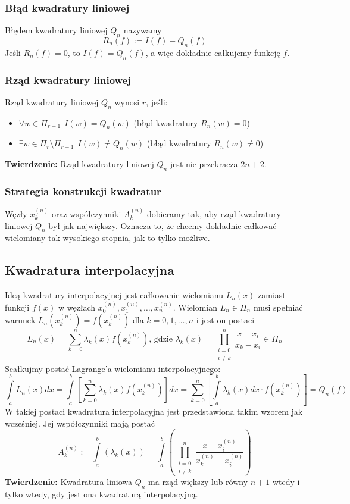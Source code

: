 \documentclass[a4paper,11pt]{article}
\begin{document}
\subsubsection{Błąd kwadratury liniowej}
Błędem kwadratury liniowej $Q_n$ nazywamy
$$ R_n(f) := I(f) - Q_n(f) $$
\noindent Jeśli $R_n(f) =0$, to $I(f) = Q_n(f)$, a więc dokładnie całkujemy funkcję $f$.

\subsubsection{Rząd kwadratury liniowej}
Rząd kwadratury liniowej $Q_n$ wynosi $r$, jeśli:
\begin{itemize}
\item $\forall w \in \Pi_{r-1}\ \  I(w)=Q_n(w)$ (błąd kwadratury $R_n(w)=0$)
\item $\exists w \in \Pi_r \setminus \Pi_{r-1}\ \  I(w) \neq Q_n(w)$ (błąd kwadratury $R_n(w) \neq 0$)
\end{itemize}
\textbf{Twierdzenie:} Rząd kwadratury liniowej $Q_n$ jest nie przekracza $2n+2$.

\subsubsection{Strategia konstrukcji kwadratur}
Węzły $x_k^{(n)}$ oraz współczynniki $A_k^{(n)}$ dobieramy tak, aby rząd kwadratury liniowej $Q_n$ był jak największy. Oznacza to, że chcemy dokładnie całkować wielomiany tak wysokiego stopnia, jak to tylko możliwe.

\subsection{Kwadratura interpolacyjna}
Ideą kwadratury interpolacyjnej jest całkowanie wielomianu $L_n(x)$ zamiast funkcji $f(x)$ w węzłach $x_0^{(n)}, x_1^{(n)}, \ldots, x_n^{(n)}$. Wielomian $L_n \in \Pi_n$ musi spełniać warunek $L_n(x_k^{(n)}) = f(x_k^{(n)})$ dla $k=0,1,\ldots, n$ i jest on postaci
$$ L_n(x) = \sum\limits_{k=0}^{n} \lambda_k(x)f\left( x_k^{(n)} \right) \text{, gdzie } \lambda_k(x) = \prod\limits_{\substack{i=0 \\ i \neq k}}^{n} \frac{x-x_i}{x_k-x_i} \in \Pi_n$$
\noindent Scałkujmy postać Lagrange'a wielomianu interpolacyjnego:
$$ \int\limits_{a}^{b} L_n(x)dx = \int\limits_{a}^{b} \left[ \sum\limits_{k=0}^{n} \lambda_k(x) f\left( x_k^{(n)} \right) \right] dx = \sum\limits_{k=0}^{n} \left[ \int\limits_{a}^{b} \lambda_k(x)dx \cdot f\left( x_k^{(n)} \right) \right] = Q_n(f)$$
\noindent W takiej postaci kwadratura interpolacyjna jest przedstawiona takim wzorem jak wcześniej. Jej współczynniki mają postać
$$ A_k^{(n)} := \int\limits_{a}^{b} \left( \lambda_k(x) \right) = \int\limits_{a}^{b} \left(  \prod\limits_{\substack{i=0 \\ i \neq k}}^{n} \frac{x-x_i^{(n)}}{x_k^{(n)}-x_i^{(n)}} \right)$$
\noindent \textbf{Twierdzenie:} Kwadratura liniowa $Q_n$ ma rząd większy lub równy $n+1$ wtedy i tylko wtedy, gdy jest ona kwadraturą interpolacyjną.
\end{document}
